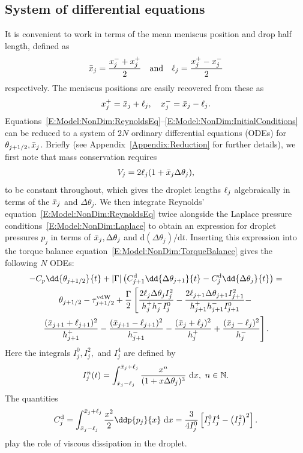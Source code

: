 \subsection{System of differential equations}
It is convenient to work in terms of the mean meniscus position and drop half length, defined as
\begin{equation}\label{E:Model:DAEs:Definition_xbar_ell}
\bar{x}_j = \frac{x_{j}^{-} + x_{j}^{+}}{2}\quad \text{and}\quad \ell_j = \frac{x_{j}^{+} - x_{j}^{-}}{2}
\end{equation}
respectively. The meniscus positions are easily recovered from these as
\begin{equation}
x_{j}^{+} = \bar{x}_j + \ell_j, \quad x_{j}^{-} = \bar{x}_j - \ell_j.
\end{equation}
Equations~\eqref{E:Model:NonDim:ReynoldsEq}--\eqref{E:Model:NonDim:InitialConditions} can be reduced to a system of $2N$ ordinary differential equations (ODEs) for $\theta_{j+1/2}, \bar{x}_j$. Briefly (see Appendix~\ref{Appendix:Reduction} for further details), we first note that mass conservation requires
\begin{equation}\label{E:Model:DAEs:CoMass}
V_j = 2\ell_j(1 + \bar{x}_j\Delta \theta_j),
\end{equation}
to be constant throughout, which gives the droplet lengths $\ell_j$ algebraically in terms of the $\bar{x}_j$ and $\Delta \theta_{j}$. We then integrate Reynolds' equation~\eqref{E:Model:NonDim:ReynoldsEq} twice alongside the Laplace pressure conditions~\eqref{E:Model:NonDim:Laplace} to obtain an expression for droplet pressures $p_j$ in terms of $\bar{x}_j, \Delta \theta_j$ and $\mathrm{d}(\Delta \theta_j)/\mathrm{d}t$. Inserting this expression into the torque balance equation~\eqref{E:Model:NonDim:TorqueBalance} gives the following $N$ ODEs:
\begin{multline}
-C_p\dd{\theta_{j+1/2}}{t} +|\Gamma|\left( \viscdamp_{j+1}\dd{\Delta \theta_{j+1}}{t} -  \viscdamp_{j}\dd{\Delta \theta_{j}}{t}\right) =\\
\theta_{j+1/2} - \tau^{\text{vdW}}_{j+1/2} + \frac{\Gamma}{2}\left[\frac{2\ell_{j}\Delta \theta_{j}I^2_j}{ h_j^+ h_j^-I^0_j} - \frac{2\ell_{j+1}\Delta \theta_{j+1}I^2_{j+1}}{ h_{j+1}^+ h_{j+1}^-I^0_{j+1}} -\right. \\
\left.\frac{(\bar{x}_{j+1}+\ell_{j+1})^2}{h_{j+1}^+} - \frac{(\bar{x}_{j+1}-\ell_{j+1})^2}{h_{j+1}^-} - \frac{(\bar{x}_{j}+\ell_{j})^2}{h_{j}^+} + \frac{(\bar{x}_{j}-\ell_{j})^2}{h_{j}^-}\right].\label{E:Model:DAEs:TorqueBal}
\end{multline}
Here the integrals $I_j^0, I_j^2,$ and $I_j^4$ are defined by
\begin{equation}\label{E:Model:DAEs:InDefinition}
I_j^n(t) = \int_{\bar{x}_j - \ell_j}^{\bar{x}_j + \ell_j} \frac{x^n}{(1 + x\Delta \theta_j)^3}~\mathrm{d}x, ~n \in \mathbb{N}.
\end{equation}
The quantities
\begin{equation}\label{E:Model:DAEs:ViscDampDefn}
\viscdamp_j = \int_{\xbarj - \ellj}^{\xbarj + \ellj}\frac{x^2}{2}\ddp{p_j}{x}~\mathrm{d}x=  \frac{3}{4I^0_j}\left[I^0_j I^4_j - \left(I^2_j\right)^2\right].
\end{equation}
play the role of viscous dissipation in the droplet.


